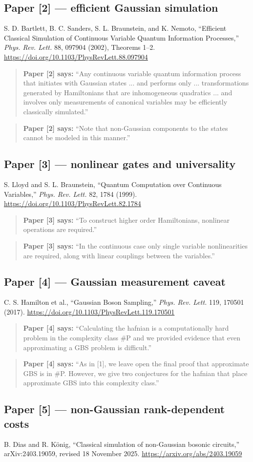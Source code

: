 \documentclass[10pt]{article}
\newcommand{\paperquote}[2]{%
  \begin{quote}\small\textbf{Paper [#1] says:} ``#2''\end{quote}}
\begin{document}
\subsection*{Paper [2] --- efficient Gaussian simulation}
S. D. Bartlett, B. C. Sanders, S. L. Braunstein, and K. Nemoto,
``Efficient Classical Simulation of Continuous Variable Quantum Information Processes,''
\emph{Phys. Rev. Lett.} 88, 097904 (2002), Theorems 1--2.
\url{https://doi.org/10.1103/PhysRevLett.88.097904}

\paperquote{2}{Any continuous variable quantum information process that initiates with Gaussian
states ... and performs only ... transformations generated by Hamiltonians that are inhomogeneous
quadratics ... and involves only measurements of canonical variables may be efficiently classically
simulated.}
\paperquote{2}{Note that non-Gaussian components to the states cannot be modeled in this manner.}

\subsection*{Paper [3] --- nonlinear gates and universality}
S. Lloyd and S. L. Braunstein, ``Quantum Computation over Continuous Variables,''
\emph{Phys. Rev. Lett.} 82, 1784 (1999).
\url{https://doi.org/10.1103/PhysRevLett.82.1784}

\paperquote{3}{To construct higher order Hamiltonians, nonlinear operations are required.}
\paperquote{3}{In the continuous case only single variable nonlinearities are required, along with
linear couplings between the variables.}

\subsection*{Paper [4] --- Gaussian measurement caveat}
C. S. Hamilton et al., ``Gaussian Boson Sampling,'' \emph{Phys. Rev. Lett.} 119, 170501 (2017).
\url{https://doi.org/10.1103/PhysRevLett.119.170501}

\paperquote{4}{Calculating the hafnian is a computationally hard problem in the complexity class
\#P and we provided evidence that even approximating a GBS problem is difficult.}
\paperquote{4}{As in [1], we leave open the final proof that approximate GBS is in \#P. However, we
give two conjectures for the hafnian that place approximate GBS into this complexity class.}

\subsection*{Paper [5] --- non-Gaussian rank-dependent costs}
B. Dias and R. K\"onig, ``Classical simulation of non-Gaussian bosonic circuits,'' arXiv:2403.19059,
revised 18 November 2025.
\url{https://arxiv.org/abs/2403.19059}
\end{document}
